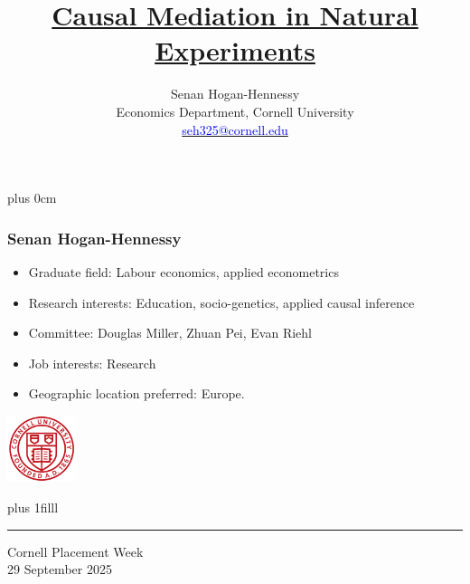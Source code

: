 \documentclass[dvipsnames]{beamer} %
\title{\color{titleText}
    \href{https://raw.githubusercontent.com/shoganhennessy/mediation-natural-experiment/main/mediation-natural-experiment-2025.pdf}{Causal Mediation in Natural Experiments}
}
\author[Senan Hogan-Hennessy, Cornell University]{
    Senan Hogan-Hennessy \\
    Economics Department, Cornell University \\ %
    \href{mailto:seh325@cornell.edu}{\textcolor{blue}{seh325@cornell.edu}}
}
\date{} %
\renewcommand{\raggedright}{\leftskip=0pt \rightskip=0pt plus 0cm}
\begin{document}
\raggedright
\begin{frame}[noframenumbering]
    \frametitle{Senan Hogan-Hennessy}
    \begin{itemize}
        \item Graduate field:
        \hfill Labour economics, applied econometrics
        \item Research interests:
        \hfill Education, socio-genetics, applied causal inference
        \item Committee:
        \hfill Douglas Miller, Zhuan Pei, Evan Riehl
        \item Job interests:
        \hfill Research
        \item Geographic location preferred:
        \hfill Europe. 
    \end{itemize}
\end{frame}
\begin{frame}
    \vspace{1.5cm}
    \titlepage
    \begin{center}
        \vspace{-1.5cm}
        \includegraphics[width=2cm]{presentation-files/cornell}

        \vskip0pt plus 1filll
        \par\noindent\rule{\textwidth}{0.4pt}
        Cornell Placement Week \\
        29 September 2025
    \end{center}
\end{frame}
\end{document}
